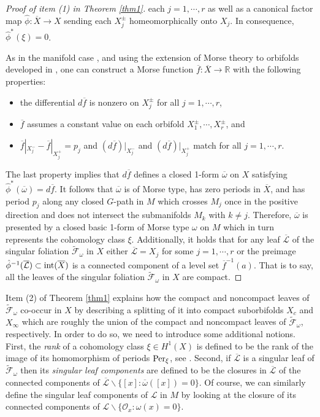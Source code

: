 \documentclass[
  a4paper, 
  reqno, 
  oneside, 
  12pt
]{amsart}
\theoremstyle{definition}
\theoremstyle{remark}
\begin{document}
\begin{proof}[Proof of item (1) in Theorem \ref{thm1}]
each $j=1, \cdots, r$ as well as a canonical factor map $\hat{\phi}:\overline{X}\to X$ sending each $X^\pm_j$ homeomorphically onto $X_j$. In consequence, $\hat{\phi}^\ast (\xi)=0$. 

As in the manifold case \cite[p. 128]{F}, and using the extension of Morse theory to orbifolds developed in \cite{Hep}, one can construct a Morse function $\overline{f}: \overline{X}\to \mathbb{R}$ with the following properties:
\begin{itemize}
\item the differential $d\overline{f}$ is nonzero on $X^\pm_j$ for all $j=1, \cdots, r$,
\item $\overline{f}$ assumes a constant value on each orbifold $X^\pm_1, \cdots, X^\pm_r$, and
\item $\overline{f}|_{X^-_j}-\overline{f}|_{X^+_j}=p_j$ and $(d\overline{f})|_{X^-_j}$ and $(d\overline{f})|_{X^+_j}$ match for all $j=1, \cdots, r$.
\end{itemize}

The last property implies that $d\overline{f}$ defines a closed 1-form $\overline{\omega}$ on $X$ satisfying $\hat{\phi}^\ast (\overline{\omega})=d\overline{f}$. It follows that $\overline{\omega}$ is of Morse type, has zero periods in $\overline{X}$, and has period $p_j$ along any closed $G$-path in $M$ which crosses $M_j$ once in the positive direction and does not intersect the submanifolds $M_k$ with $k\neq j$. Therefore, $\overline{\omega}$ is presented by a closed basic 1-form of Morse type $\omega$ on $M$ which in turn represents the cohomology class $\xi$. Additionally, it holds that for any leaf $\overline{\mathcal{L}}$ of the singular foliation $\tilde{\mathcal{F}}_\omega$ in $X$ either $\overline{\mathcal{L}}=X_j$ for some $j=1,\cdots, r$ or the preimage $\hat{\phi}^{-1}(\overline{\mathcal{L}})\subset \textnormal{int}(\overline{X})$ is a connected component of a level set $\overline{f}^{-1}(a)$. That is to say, all the leaves of the singular foliation $\tilde{\mathcal{F}}_\omega$ in $X$ are compact.
\end{proof}


Item (2) of Theorem \ref{thm1} explains how the compact and noncompact leaves of $\tilde{\mathcal{F}}_\omega$ co-occur in $X$ by describing a splitting of it into compact suborbifolds $X_c$ and $X_\infty$ which are roughly the union of the compact and noncompact leaves of $\tilde{\mathcal{F}}_\omega$, respectively. In order to do so, we need to introduce some additional notions. First, the \emph{rank} of a cohomology class $\xi\in H^1(X)$ is defined to be the rank of the image of its homomorphism of periods $\textnormal{Per}_\xi$, see \cite{V}. Second, if $\overline{\mathcal{L}}$ is a singular leaf of $\tilde{\mathcal{F}}_\omega$ then its \emph{singular leaf components} are defined to be the closures in $\overline{\mathcal{L}}$ of the connected components of $\overline{\mathcal{L}}\backslash  \lbrace [x]: \overline{\omega}([x])=0\rbrace$. Of course, we can similarly define the singular leaf components of $\mathcal{L}$ in $M$ by looking at the closure of its connected components of $\mathcal{L}\backslash  \lbrace \mathcal{O}_x: \omega(x)=0\rbrace$.
\end{document}
